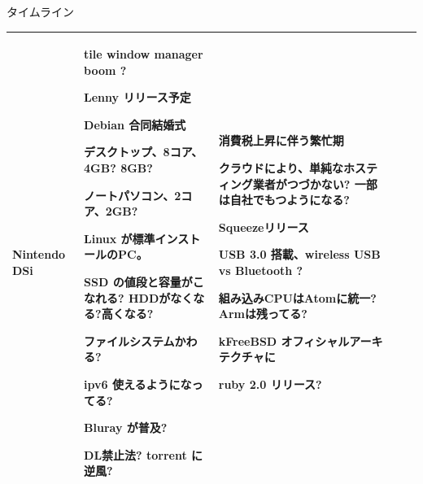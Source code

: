 \begin{frame}{タイムライン}
{\begin{tabular}[t]{|p{2em}|p{3em}|p{9em}|p{7em}|p{6em}|}
Nintendo DSi

&

tile window manager boom ?

Lenny リリース予定

Debian 合同結婚式

デスクトップ、8コア、4GB? 8GB?

ノートパソコン、2コア、2GB?

Linux が標準インストールのPC。

SSD の値段と容量がこなれる?
HDDがなくなる?高くなる?

ファイルシステムかわる?

ipv6 使えるようになってる?

Bluray が普及?

DL禁止法? torrent に逆風?

&

消費税上昇に伴う繁忙期

クラウドにより、単純なホスティング業者がつづかない?
一部は自社でもつようになる?

Squeezeリリース

USB 3.0 搭載、wireless USB vs Bluetooth ?

組み込みCPUはAtomに統一?Armは残ってる?

kFreeBSD オフィシャルアーキテクチャに

ruby 2.0 リリース?


\\

\hline
\end{tabular}

}
\end{frame}


